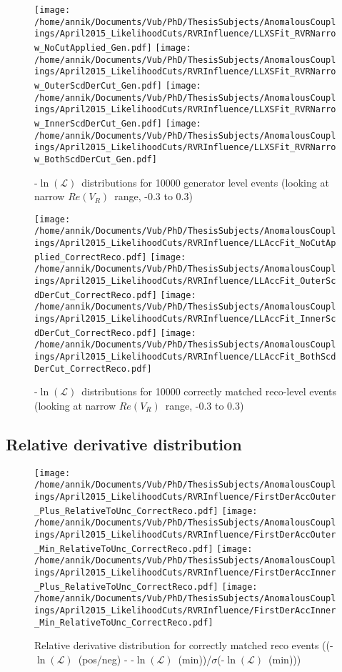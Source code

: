 \documentclass[a4paper,10pt]{article}
\newcommand{\NegLL}{-$\ln(\mathcal{L})$~}
\newcommand{\RVR}{$Re(V_R)$~}
\begin{document}
\begin{figure}[h!t]
 \centering
 \texttt{[image: /home/annik/Documents/Vub/PhD/ThesisSubjects/AnomalousCouplings/April2015\_LikelihoodCuts/RVRInfluence/LLXSFit\_RVRNarrow\_NoCutApplied\_Gen.pdf]}
 \texttt{[image: /home/annik/Documents/Vub/PhD/ThesisSubjects/AnomalousCouplings/April2015\_LikelihoodCuts/RVRInfluence/LLXSFit\_RVRNarrow\_OuterScdDerCut\_Gen.pdf]}
 \texttt{[image: /home/annik/Documents/Vub/PhD/ThesisSubjects/AnomalousCouplings/April2015\_LikelihoodCuts/RVRInfluence/LLXSFit\_RVRNarrow\_InnerScdDerCut\_Gen.pdf]}
 \texttt{[image: /home/annik/Documents/Vub/PhD/ThesisSubjects/AnomalousCouplings/April2015\_LikelihoodCuts/RVRInfluence/LLXSFit\_RVRNarrow\_BothScdDerCut\_Gen.pdf]}
 \caption{\NegLL distributions for 10000 generator level events (looking at narrow \RVR range, -0.3 to 0.3)}
\end{figure}

\begin{figure}[h!t]
 \centering
 \texttt{[image: /home/annik/Documents/Vub/PhD/ThesisSubjects/AnomalousCouplings/April2015\_LikelihoodCuts/RVRInfluence/LLAccFit\_NoCutApplied\_CorrectReco.pdf]}
 \texttt{[image: /home/annik/Documents/Vub/PhD/ThesisSubjects/AnomalousCouplings/April2015\_LikelihoodCuts/RVRInfluence/LLAccFit\_OuterScdDerCut\_CorrectReco.pdf]}
 \texttt{[image: /home/annik/Documents/Vub/PhD/ThesisSubjects/AnomalousCouplings/April2015\_LikelihoodCuts/RVRInfluence/LLAccFit\_InnerScdDerCut\_CorrectReco.pdf]}
 \texttt{[image: /home/annik/Documents/Vub/PhD/ThesisSubjects/AnomalousCouplings/April2015\_LikelihoodCuts/RVRInfluence/LLAccFit\_BothScdDerCut\_CorrectReco.pdf]}
 \caption{\NegLL distributions for 10000 correctly matched reco-level events (looking at narrow \RVR range, -0.3 to 0.3)}
\end{figure}

\subsection{Relative derivative distribution}

\begin{figure}[h!t]
 \centering
 \texttt{[image: /home/annik/Documents/Vub/PhD/ThesisSubjects/AnomalousCouplings/April2015\_LikelihoodCuts/RVRInfluence/FirstDerAccOuter\_Plus\_RelativeToUnc\_CorrectReco.pdf]}
 \texttt{[image: /home/annik/Documents/Vub/PhD/ThesisSubjects/AnomalousCouplings/April2015\_LikelihoodCuts/RVRInfluence/FirstDerAccOuter\_Min\_RelativeToUnc\_CorrectReco.pdf]}
 \texttt{[image: /home/annik/Documents/Vub/PhD/ThesisSubjects/AnomalousCouplings/April2015\_LikelihoodCuts/RVRInfluence/FirstDerAccInner\_Plus\_RelativeToUnc\_CorrectReco.pdf]}
 \texttt{[image: /home/annik/Documents/Vub/PhD/ThesisSubjects/AnomalousCouplings/April2015\_LikelihoodCuts/RVRInfluence/FirstDerAccInner\_Min\_RelativeToUnc\_CorrectReco.pdf]}
 \caption{Relative derivative distribution for correctly matched reco events ((\NegLL(pos/neg) - \NegLL(min))/$\sigma$(\NegLL(min)))}
\end{figure}
\end{document}
